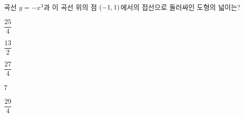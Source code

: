 곡선 $y=-x^3$과 이 곡선 위의 점 $(-1{,}\mkern3mu\mathopen{}1)$에서의 접선으로 둘러싸인 도형의 넓이는?
\begin{choices32}{\rule[-3ex]{0pt}{8ex}$\dfrac{25}{4}$}{\rule[-3ex]{0pt}{8ex}$\dfrac{13}{2}$}{\rule[-3ex]{0pt}{8ex}$\dfrac{27}{4}$}{\rule[-3ex]{0pt}{8ex}$7$}{\rule[-3ex]{0pt}{8ex}$\dfrac{29}{4}$}\end{choices32}
